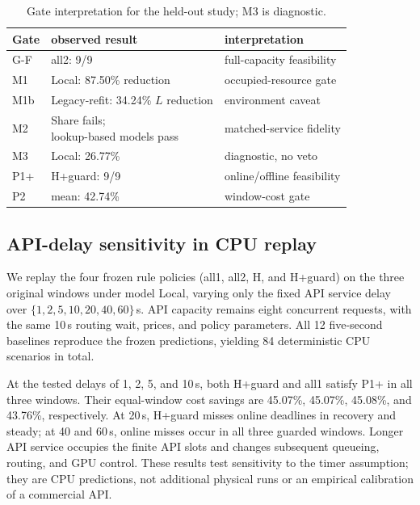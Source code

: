 \begin{table}[h]
\centering
\small
\caption{Gate interpretation for the held-out study; M3 is diagnostic.}
\label{tab:gates}
\setlength{\tabcolsep}{2pt}
\par\vspace{4pt}
\begin{tabular*}{\linewidth}{@{\extracolsep{\fill}}lll@{}}
\toprule
Gate & observed result & interpretation\\
\midrule
G-F & all2: 9/9 & full-capacity feasibility\\
M1 & Local: 87.50\% reduction & occupied-resource gate\\
M1b & \shortstack[l]{Legacy-refit: 34.24\%\\$L$ reduction} & environment caveat\\
M2 & \shortstack[l]{Share fails;\\lookup-based models pass} & matched-service fidelity\\
M3 & Local: 26.77\% & diagnostic, no veto\\
P1+ & H+guard: 9/9 & online/offline feasibility\\
P2 & mean: 42.74\% & window-cost gate\\
\bottomrule
\end{tabular*}
\end{table}

\subsection{API-delay sensitivity in CPU replay}
\label{sec:api-delay-sensitivity}

We replay the four frozen rule policies (all1, all2, H, and H+guard)
on the three original windows under model Local, varying only the fixed
API service delay over $\{1,2,5,10,20,40,60\}$\,s. API capacity remains
eight concurrent requests, with the same 10\,s routing wait, prices,
and policy parameters. All 12 five-second baselines reproduce the
frozen predictions, yielding 84 deterministic CPU scenarios in total.

At the tested delays of 1, 2, 5, and 10\,s, both H+guard and all1
satisfy P1+ in all three windows. Their equal-window cost savings
are 45.07\%, 45.07\%, 45.08\%, and 43.76\%, respectively.
At 20\,s, H+guard misses online deadlines in recovery and steady;
at 40 and 60\,s, online misses occur in all three guarded windows.
Longer API service occupies the finite API slots and changes
subsequent queueing, routing, and GPU control. These results test
sensitivity to the timer assumption; they are CPU predictions,
not additional physical runs or an empirical calibration of a
commercial API.

